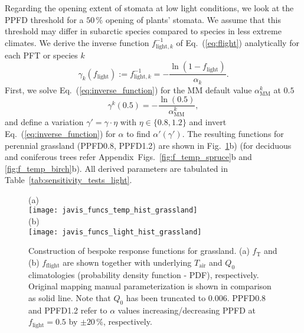 \documentclass[bg, manuscript]{copernicus}
\begin{document}
Regarding the opening extent of stomata at low light conditions, we look at the PPFD threshold for a $50\,\unit{\%}$ opening of plants' stomata. We assume that this threshold may differ in subarctic species compared to species in less extreme climates. We derive the inverse function $f_{\mathrm{light},k}^{-1}$ of Eq.~(\ref{eq:flight}) analytically for each PFT or species $k$
\begin{equation}
  \gamma_k(f_\mathrm{light}) := f_{\mathrm{light}, k}^{-1} = -\frac{\ln(1-f_\mathrm{light})}{\alpha_k}.
  \label{eq:inverse_function}
\end{equation}
First, we solve Eq.~(\ref{eq:inverse_function}) for the MM default value $\alpha_\mathrm{MM}^k$ at $0.5$ 
\begin{equation}
  \gamma^k(0.5) = -\frac{\ln(0.5)}{\alpha_\mathrm{MM}^k},
  \label{eq:inverse_function_halfway}
\end{equation}
and define a variation $\gamma' = \gamma \cdot \eta$ with $\eta \in \{0.8, 1.2\}$ and invert Eq.~(\ref{eq:inverse_function}) for $\alpha$ to find $\alpha'(\gamma')$. The resulting functions for perennial grassland (PPFD0.8, PPFD1.2) are shown in Fig.~\ref{fig:f_temp_grassland}b) (for deciduous and coniferous trees refer Appendix~Figs.~\ref{fig:f_temp_spruce}b and \ref{fig:f_temp_birch}b). All derived parameters are tabulated in Table~\ref{tab:sensitivity_tests_light}.

\begin{figure}[t]
  \centering
  (a)\\
  \texttt{[image: javis\_funcs\_temp\_hist\_grassland]}\\
  (b)\\
  \texttt{[image: javis\_funcs\_light\_hist\_grassland]}
\caption{Construction of bespoke response functions for grassland. (a) $f_\mathrm{T}$ and (b) $f_\mathrm{flight}$ are shown together with underlying $T_\mathrm{air}$ and $Q_0$ climatologies (probability density function - PDF), respectively. Original mapping manual parameterization is shown in comparison as solid line. Note that $Q_0$ has been truncated to $0.006$. PPFD0.8 and PPFD1.2 refer to $\alpha$ values increasing/decreasing PPFD at $f_\mathrm{light}=0.5$ by $\pm 20\,\%$, respectively.}
\label{fig:f_temp_grassland}
\end{figure}
\end{document}
